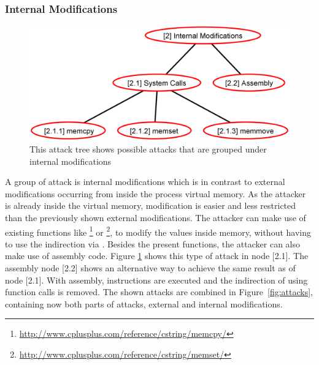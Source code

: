 \subsubsection{Internal Modifications}
\label{sec:internal_modifications}
\begin{figure}[h]
\centering
\includegraphics[width=.75\textwidth, keepaspectratio]{sections/adtrees/InternalModificationsWithoutDefenses.png}
\caption{This attack tree shows possible attacks that are grouped under internal modifications}
\label{fig:attacks_internal}
\end{figure}
A group of attack is internal modifications which is in contrast to external modifications occurring from inside the process virtual memory. As the attacker is already inside the virtual memory, modification is easier and less restricted than the previously shown external modifications. The attacker can make use of existing functions like \footnote{\url{http://www.cplusplus.com/reference/cstring/memcpy/}} or \footnote{\url{http://www.cplusplus.com/reference/cstring/memset/}}, to modify the values inside memory, without having to use the indirection via . Besides the present  functions, the attacker can also make use of assembly code. Figure \ref{fig:attacks_internal} shows this type of attack in node [2.1]. The assembly node [2.2] shows an alternative way to achieve the same result as of node [2.1]. With assembly, instructions are executed and the indirection of using function calls is removed. The shown attacks are combined in Figure~\ref{fig:attacks}, containing now both parts of attacks, external and internal modifications.